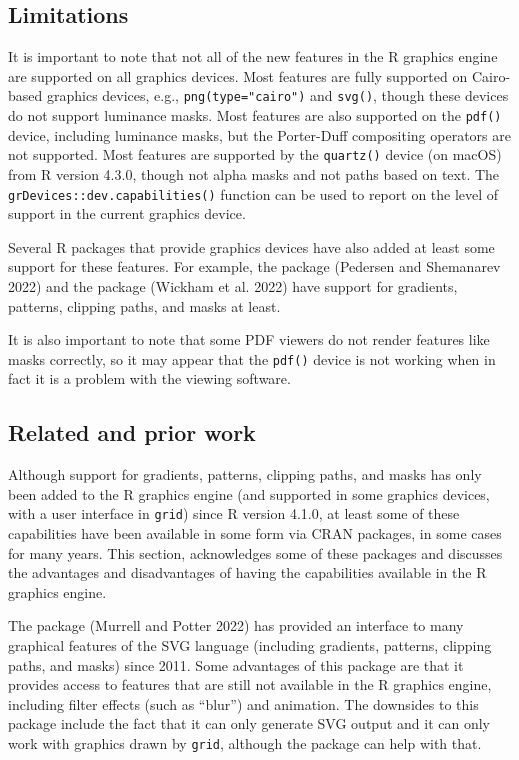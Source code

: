 \hypertarget{limitations}{%
\subsection{Limitations}\label{limitations}}

It is important to note that not all of the new features
in the R graphics engine are supported
on all graphics devices.
Most features are fully supported on Cairo-based graphics devices, e.g.,
\texttt{png(type="cairo")} and \texttt{svg()}, though these devices do not support
luminance masks.
Most features are also supported on the
\texttt{pdf()} device, including luminance masks, but
the Porter-Duff compositing operators are not supported.
Most features are supported by the \texttt{quartz()} device (on macOS)
from R version 4.3.0, though not alpha masks and not paths based on text.
The \texttt{grDevices::dev.capabilities()} function can be used to report on
the level of support in the current graphics device.

Several R packages that provide graphics devices have also added at least
some support for these features. For example, the  package
(Pedersen and Shemanarev 2022)
and the  package (Wickham et al. 2022)
have support for gradients, patterns, clipping paths, and masks at least.

It is also important to note that
some PDF viewers do not render features like masks correctly,
so it may appear that the \texttt{pdf()} device is not working when in fact
it is a problem with the viewing software.

\hypertarget{related-and-prior-work}{%
\subsection{Related and prior work}\label{related-and-prior-work}}

Although support for gradients, patterns, clipping paths, and masks
has only been added to the R graphics engine (and supported
in some graphics devices, with a user interface in \texttt{grid}) since
R version 4.1.0,
at least some of these capabilities have been available in
some form via CRAN packages, in some cases for many years.
This section, acknowledges some of these packages and discusses
the advantages and disadvantages of having the capabilities
available in the R graphics engine.

The  package (Murrell and Potter 2022) has
provided an interface to many graphical features of the SVG language
(including gradients, patterns, clipping paths, and masks)
since 2011.
Some advantages of this package are that it provides access to
features that are still not available in the R graphics engine,
including filter effects (such as ``blur'') and animation.
The downsides to this package include the fact that
it can only generate SVG output and it
can only work with graphics drawn by \texttt{grid}, although the
 package can help with that.

